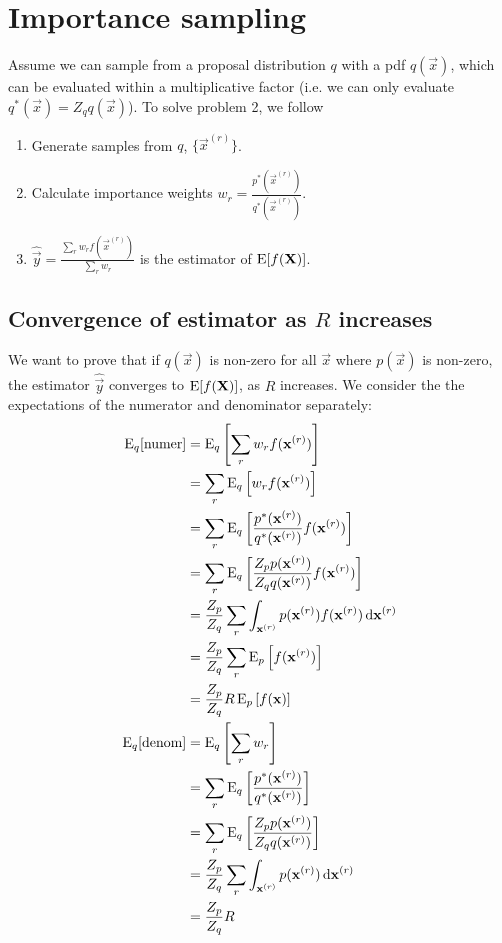 \section{Importance sampling}

Assume we can sample from a proposal distribution $q$ with a pdf $q(\vec x)$, which can be evaluated within a multiplicative factor (i.e. we can only evaluate $q^\ast(\vec x) = Z_q q(\vec x)$). To solve problem 2, we follow
\begin{enumerate}
    \item Generate samples from $q$, $\{\vec x^{(r)}\}$.
    \item Calculate importance weights $w_r = \frac{p^\ast(\vec x^{(r)})}{q^\ast(\vec x^{(r)})}$.
    \item $\hat{\vec y} = \frac{\sum_r w_r f(\vec x^{(r)})}{\sum_r w_r}$ is the estimator of $\operatorname{\mathrm{E}}[f(\boldsymbol{\mathbf{X}})]$.
\end{enumerate}

\subsection{Convergence of estimator as $R$ increases}
    We want to prove that if $q(\vec x)$ is non-zero for all $\vec x$ where $p(\vec x)$ is non-zero, the estimator $\hat{\vec y}$ converges to $\operatorname{\mathrm{E}}[f(\boldsymbol{\mathbf{X}})]$, as $R$ increases. We consider the the expectations of the numerator and denominator separately:
    \begin{align}
        \operatorname{\mathrm{E}}_q[\text{numer}]  &= \operatorname{\mathrm{E}}_q\left[\sum_r w_r f(\boldsymbol{\mathbf{x}}^{(r)})\right] \\
                            &= \sum_r \operatorname{\mathrm{E}}_q\left[w_r f(\boldsymbol{\mathbf{x}}^{(r)})\right] \\
                            &= \sum_r \operatorname{\mathrm{E}}_q\left[\frac{p^\ast(\boldsymbol{\mathbf{x}}^{(r)})}{q^\ast(\boldsymbol{\mathbf{x}}^{(r)})} f(\boldsymbol{\mathbf{x}}^{(r)})\right] \\
                            &= \sum_r \operatorname{\mathrm{E}}_q\left[\frac{Z_p p(\boldsymbol{\mathbf{x}}^{(r)})}{Z_q q(\boldsymbol{\mathbf{x}}^{(r)})} f(\boldsymbol{\mathbf{x}}^{(r)})\right] \\
                            &= \frac{Z_p}{Z_q} \sum_r \int_{\boldsymbol{\mathbf{x}}^{(r)}} p(\boldsymbol{\mathbf{x}}^{(r)}) f(\boldsymbol{\mathbf{x}}^{(r)}) \, \mathrm d \boldsymbol{\mathbf{x}}^{(r)} \\
                            &= \frac{Z_p}{Z_q} \sum_r \operatorname{\mathrm{E}}_p\left[f(\boldsymbol{\mathbf{x}}^{(r)})\right] \\
                            &= \frac{Z_p}{Z_q} R \operatorname{\mathrm{E}}_p\left[f(\boldsymbol{\mathbf{x}})\right] \\
        \operatorname{\mathrm{E}}_q[\text{denom}]  &= \operatorname{\mathrm{E}}_q\left[\sum_r w_r\right] \\
                            &= \sum_r \operatorname{\mathrm{E}}_q\left[\frac{p^\ast(\boldsymbol{\mathbf{x}}^{(r)})}{q^\ast(\boldsymbol{\mathbf{x}}^{(r)})}\right] \\
                            &= \sum_r \operatorname{\mathrm{E}}_q\left[\frac{Z_p p(\boldsymbol{\mathbf{x}}^{(r)})}{Z_q q(\boldsymbol{\mathbf{x}}^{(r)})}\right] \\
                            &= \frac{Z_p}{Z_q} \sum_r \int_{\boldsymbol{\mathbf{x}}^{(r)}} p(\boldsymbol{\mathbf{x}}^{(r)}) \,\mathrm d \boldsymbol{\mathbf{x}}^{(r)} \\
                            &= \frac{Z_p}{Z_q} R
    \end{align}

